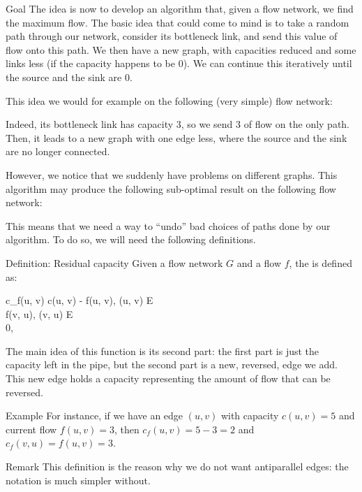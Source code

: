 \documentclass[a4paper]{article}
\begin{document}
\begin{parag}{Goal}
    The idea is now to develop an algorithm that, given a flow network, we find the maximum flow. The basic idea that could come to mind is to take a random path through our network, consider its bottleneck link, and send this value of flow onto this path. We then have a new graph, with capacities reduced and some links less (if the capacity happens to be 0). We can continue this iteratively until the source and the sink are 0.

    This idea we would for example on the following (very simple) flow network:

    Indeed, its bottleneck link has capacity $3$, so we send 3 of flow on the only path. Then, it leads to a new graph with one edge less, where the source and the sink are no longer connected. 

    However, we notice that we suddenly have problems on different graphs. This algorithm may produce the following sub-optimal result on the following flow network:

    This means that we need a way to ``undo'' bad choices of paths done by our algorithm. To do so, we will need the following definitions.
\end{parag}


\begin{parag}{Definition: Residual capacity}
    Given a flow network $G$ and a flow $f$, the  is defined as:
    \begin{functionbypart}{c_f\left(u, v\right)}
    c\left(u, v\right) - f\left(u, v\right), \mathspace {} \left(u, v\right) \in E  \\
    f\left(v, u\right), \mathspace {} \left(v, u\right) \in E \\
    0, \mathspace {}
    \end{functionbypart}

    The main idea of this function is its second part: the first part is just the capacity left in the pipe, but the second part is a new, reversed, edge we add. This new edge holds a capacity representing the amount of flow that can be reversed.

    \begin{subparag}{Example}
            For instance, if we have an edge $\left(u, v\right)$ with capacity $c\left(u, v\right) = 5$ and current flow $f\left(u, v\right) = 3$, then $c_f\left(u, v\right) = 5 - 3 = 2$ and $c_f\left(v, u\right) = f\left(u, v\right) = 3$.
    \end{subparag}
        
    \begin{subparag}{Remark}
            This definition is the reason why we do not want antiparallel edges: the notation is much simpler without.
    \end{subparag}
\end{parag}
\end{document}
